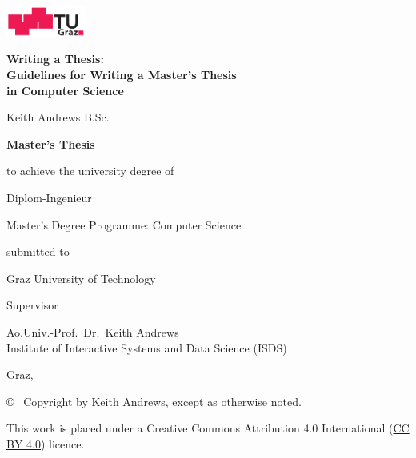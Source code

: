 \begin{center}
\includegraphics[height=1cm]{diagrams/tugraz-logo.pdf}

\vspace{2cm}

\begin{spacing}{1.1}
\huge\sffamily\bfseries
Writing a Thesis:\\
Guidelines for Writing a Master's Thesis\\
in Computer Science
\end{spacing}

\vspace{2cm}

{\Large\sffamily Keith Andrews B.Sc.}

\vspace{2cm}

{\Large\sffamily\bfseries Master's Thesis}

\vspace{5mm}

{\small\sffamily to achieve the university degree of}

\vspace{5mm}

{\normalsize\sffamily Diplom-Ingenieur}

\vspace{5mm}

{\normalsize\sffamily
Master's Degree Programme: Computer Science
}


\vspace{1cm}

{\small\sffamily submitted to}

\vspace{5mm}

{\large\sffamily Graz University of Technology}



\vspace{1cm}

{\small\sffamily Supervisor}

\vspace{5mm}

{\normalsize\sffamily
Ao.Univ.-Prof.\ Dr.\ Keith Andrews \\
Institute of Interactive Systems and Data Science (ISDS)
}


\vspace{1cm}

{\normalsize\sffamily Graz, \thisdate}



\vfill

{\footnotesize\sffamily \copyright ~ Copyright \thisyear by Keith Andrews,
except as otherwise noted.}

{\footnotesize\sffamily This work is placed under a
Creative Commons Attribution 4.0 International
(\href{https://creativecommons.org/licenses/by/4.0/}{CC BY 4.0}) licence.}


\end{center}





